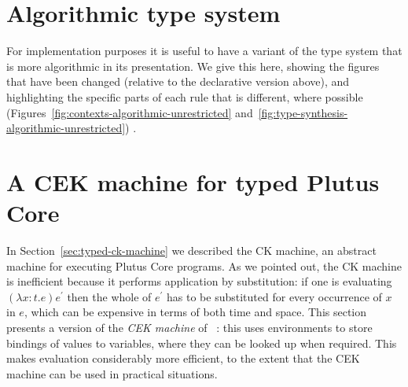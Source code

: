 \documentclass[a4paper]{article}
\begin{document}
\begin{appendices}
\section{Algorithmic type system}

For implementation purposes it is useful to have a variant of the type
system that is more algorithmic in its presentation. We give this
here, showing the figures that have been changed (relative to the
declarative version above), and highlighting the specific parts of
each rule that is different, where possible
(Figures~\ref{fig:contexts-algorithmic-unrestricted}
and~\ref{fig:type-synthesis-algorithmic-unrestricted}) .




\section{A CEK machine for typed Plutus Core}
\label{appendix:typed-cek-machine}
In Section~\ref{sec:typed-ck-machine} we described the CK machine, an
abstract machine for executing Plutus Core programs.  As we pointed
out, the CK machine is inefficient because it performs application by
substitution: if one is evaluating $(\lambda x:t.e)e^{\prime}$ then
the whole of $e^{\prime}$ has to be substituted for every occurrence
of $x$ in $e$, which can be expensive in terms of both time and space.
This section presents a version of the \textit{CEK machine} of
~\citep{Felleisen-CK-CEK}: this uses environments to store bindings of
values to variables, where they can be looked up when required. This
makes evaluation considerably more efficient, to the extent that the
CEK machine can be used in practical situations.


\end{appendices}
\end{document}
